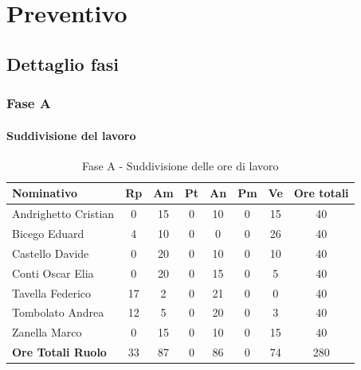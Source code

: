 \documentclass[../PianoProgetto.tex]{subfiles}
\begin{document}
	\section{Preventivo}
		\subsection{Dettaglio fasi}
			\subsubsection{Fase A}
				\paragraph{Suddivisione del lavoro}
						
	\begin{table}[h]
		\begin{tabularx}{\textwidth}{l  * {6}{C}  c}
			\toprule
			\textbf{Nominativo} & \textbf{Rp} & \textbf{Am} & \textbf{Pt} 
						& \textbf{An} & \textbf{Pm} & \textbf{Ve} & \textbf{Ore totali} \\
			\midrule
			Andrighetto Cristian & 0 & 15 &	0 &	10 & 0 & 15 & 40 \\
			Bicego Eduard & 4 & 10 & 0 & 0 & 0 & 26 & 40 \\
			Castello Davide &	0 &	20 &	0 &	10 & 0 &	10 & 40 \\
			Conti Oscar Elia & 0 & 20 &	0 &	15 & 0 & 5 & 40 \\
			Tavella Federico &	17 & 2 & 0 & 21 & 0 & 0 & 40 \\
			Tombolato Andrea & 12 & 5 &	0 &	20 & 0 & 3 & 40 \\
			Zanella Marco & 0 & 15 & 0 & 10 & 0 & 15 & 40 \\
			\midrule			
			\textbf{Ore Totali Ruolo} & 33 & 87 & 0 & 86 &	0 &	74 & 280 \\
			\bottomrule
		\end{tabularx}
		\caption{Fase A - Suddivisione delle ore di lavoro}
		\label{tab:faseA_ore}
	\end{table}

\vfill
	
\end{document}
